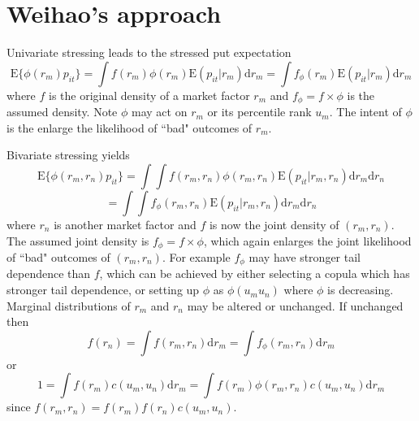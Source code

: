 \documentclass[authoryear]{elsarticle}
\newcommand{\E}{\mathrm{E}}
\newcommand{\de}{\mathrm{d}}
\begin{document}
\section{Weihao's approach}

Univariate stressing leads to the stressed put expectation
$$
\E\{\phi(r_m)p_{it}\} = \int  f(r_m)\phi(r_m)\E(p_{it}|r_m) \de r_m = \int f_\phi(r_m) \E(p_{it}|r_m) \de r_m
$$
where $f$ is the original density of a market factor $r_m$ and $f_\phi=f\times \phi$ is the assumed density. Note $\phi$ may act on $r_m$ or its percentile rank $u_m$. The intent of $\phi$ is the enlarge the likelihood of ``bad" outcomes of $r_m$.

Bivariate stressing yields
$$
\E\{\phi(r_m,r_n)p_{it}\} = \int \int f(r_m,r_n)\phi(r_m,r_n) \E(p_{it}|r_m, r_n) \de r_m \de r_n
$$
$$
= \int \int f_\phi(r_m,r_n) \E(p_{it}|r_m, r_n) \de r_m \de r_n
$$
where $r_n$ is another market factor and $f$ is now the joint density of $(r_m,r_n)$. The assumed joint density is $f_\phi=f\times \phi$, which again enlarges the joint likelihood of ``bad" outcomes of $(r_m,r_n)$. For example $f_\phi$ may have stronger tail dependence than $f$, which can be achieved by either selecting a copula which has stronger tail dependence, or setting up $\phi$ as $\phi(u_mu_n)$ where $\phi$ is decreasing. Marginal distributions of $r_m$ and $r_n$ may be altered or unchanged. If unchanged then
$$
f(r_n) = \int f(r_m,r_n) \de r_m = \int f_\phi(r_m,r_n) \de r_m
$$
or
$$
1 = \int f(r_m)c(u_m,u_n) \de r_m = \int f(r_m)\phi(r_m,r_n) c(u_m,u_n) \de r_m
$$
since $f(r_m,r_n)=f(r_m)f(r_n)c(u_m,u_n)$.
\end{document}
